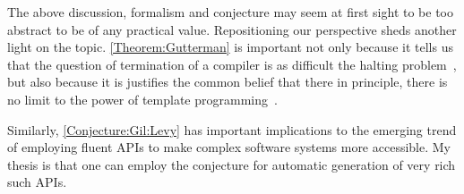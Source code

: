 The above discussion, formalism and conjecture may seem at first sight to be too abstract
  to be of any practical value.
Repositioning our perspective sheds another light on the topic.
\cref{Theorem:Gutterman} is important not only because it tells us
  that the question of termination of a \CC compiler is as difficult
  the halting problem~\cite{Halting}, but also because it
  is justifies the common belief that there in principle, there
  is no limit to the power of template programming~\cite{Templates:find:6:refs}.

Similarly, \cref{Conjecture:Gil:Levy} has important
  implications to the emerging trend of employing fluent APIs
  to make complex software systems more accessible.
My thesis is that one can employ the conjecture for 
  automatic generation of very rich such APIs.

